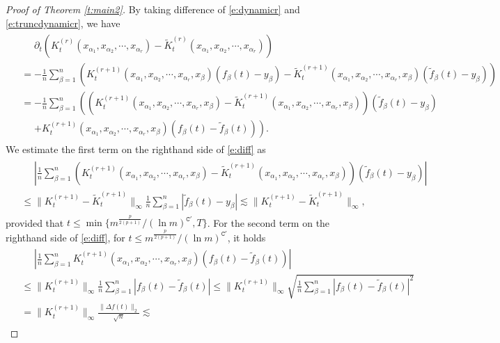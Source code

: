 \documentclass{article}
\numberwithin{equation}{section}
\newcommand{\fC}{{\mathtt C}}
\newcommand{\al}{\alpha}
\renewcommand{\leq}{\leqslant}
\newcommand{\del}{\partial}
\newcommand{\1}{\mathds{1}}
\theoremstyle{plain} %
\begin{document}
\begin{proof}[Proof of Theorem \ref{t:main2}]
By taking difference of \eqref{e:dynamicr} and \eqref{e:truncdynamicr}, we have
\begin{align}\begin{split}\label{e:diff}
&\phantom{{}={}}\del_t \left(K_t^{(r)}(x_{\al_1}, x_{\al_2}, \cdots, x_{\al_r})- \tilde K_t^{(r)}(x_{\al_1}, x_{\al_2}, \cdots, x_{\al_r})\right)\\
&=-\frac{1}{n}\sum_{\beta=1}^n\left(K_t^{(r+1)}(x_{\al_1},x_{\al_2}, \cdots, x_{\al_r},x_\beta)(f_\beta(t)-y_\beta)-\tilde K_t^{(r+1)}(x_{\al_1},x_{\al_2}, \cdots, x_{\al_r},x_\beta)(\tilde f_\beta(t)-y_\beta)\right)\\
&=-\frac{1}{n}\sum_{\beta=1}^n\left(\left(K_t^{(r+1)}(x_{\al_1},x_{\al_2}, \cdots, x_{\al_r},x_\beta)-\tilde K_t^{(r+1)}(x_{\al_1},x_{\al_2}, \cdots, x_{\al_r},x_\beta)\right)(\tilde f_\beta(t)-y_\beta)\right.\\
&\phantom{{}={}}\left.+K_t^{(r+1)}(x_{\al_1},x_{\al_2}, \cdots, x_{\al_r},x_\beta)(f_\beta(t)-\tilde f_\beta(t))\right).
\end{split}\end{align}
%
We estimate the first term on the righthand side of \eqref{e:diff} as
\begin{align}\begin{split}\label{e:tt1}
&\phantom{{}={}}\left|\frac{1}{n}\sum_{\beta=1}^n\left(K_t^{(r+1)}(x_{\al_1},x_{\al_2}, \cdots, x_{\al_r},x_\beta)-\tilde K_t^{(r+1)}(x_{\al_1},x_{\al_2}, \cdots, x_{\al_r},x_\beta)\right)(\tilde f_\beta(t)-y_\beta)\right|\\
&\leq  \|K_t^{(r+1)}-\tilde K_t^{(r+1)}\|_\infty\frac{1}{n}\sum_{\beta=1}^n
|\tilde f_\beta(t)-y_\beta|\lesssim \|K_t^{(r+1)}-\tilde K_t^{(r+1)}\|_\infty,
\end{split}\end{align}
provided that $t\leq \min\{m^{\frac{p}{2(p+1)}}/(\ln m)^{\fC'}, T\}$.
For the second term on the righthand side of \eqref{e:diff}, for $t\leq m^{\frac{p}{2(p+1)}}/(\ln m)^{\fC'}$, it holds
\begin{align}\begin{split}\label{e:tt2}
&\phantom{{}={}}\left|\frac{1}{n}\sum_{\beta=1}^nK_t^{(r+1)}(x_{\al_1},x_{\al_2}, \cdots, x_{\al_r},x_\beta)(f_\beta(t)-\tilde f_\beta(t))\right|\\
&\leq \|K_t^{(r+1)}\|_{\infty}\frac{1}{n}\sum_{\beta=1}^n |f_\beta(t)-\tilde f_{\beta}(t)|
\leq \|K_t^{(r+1)}\|_{\infty}\sqrt{\frac{1}{n}\sum_{\beta=1}^n |f_\beta(t)-\tilde f_{\beta}(t)|^2 }\\
&= \|K_t^{(r+1)}\|_{\infty}\frac{\|\Delta f(t)\|_2}{\sqrt n}\lesssim 

\end{split}
\end{align}
\end{proof}
\end{document}
